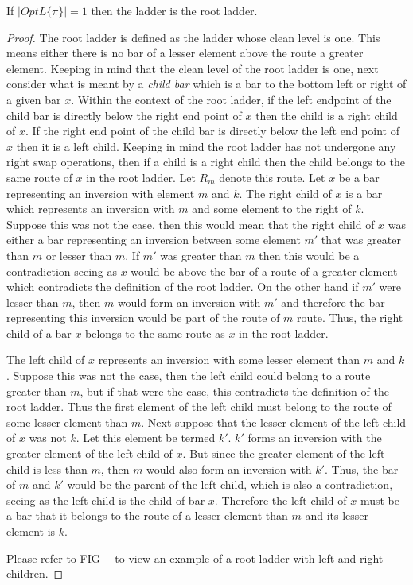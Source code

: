 \begin{theorem}
    If $|OptL\{\pi\}|=1$ then the ladder is the root ladder.
\end{theorem} 
\begin{proof}
    The root ladder is defined as the ladder whose clean level is one.
    This means either there is no bar of a lesser element above the route a 
    greater element. Keeping in mind that the clean level of the root ladder is one, next consider what is meant by a  \emph{child bar}
     which is a bar to the bottom left or right of a given bar $x$. Within the context of the root ladder, 
     if the left endpoint of the child bar is directly below the right end point of $x$ then the child is a 
    right child of $x$. If the right end point of the child bar is directly 
    below the left end point of $x$ then it is a left child. 
    Keeping in mind the root ladder has not undergone any right swap operations, then
    if a child is a right child 
    then the child belongs to the same route of $x$ in the root ladder. 
    Let $R_{m}$ denote this route. Let $x$ be a bar representing an inversion with element $m$ and $k$.
    The right child of $x$ is a bar which represents an inversion 
    with $m$ and some element to the right of $k$. Suppose this was not the case, 
    then this would mean that the right child of $x$ was either a bar representing an inversion 
    between some element $m'$ that was greater than $m$ or lesser than $m$. If $m'$ was 
    greater than $m$ then this would be a contradiction seeing as $x$ would be above the bar of a route 
    of a greater element which contradicts the definition of the root ladder. On the other hand if 
    $m'$ were lesser than $m$, then $m$ would form an inversion with $m'$ and therefore 
    the bar representing this inversion would be part of the route of $m$ route. Thus, the right child 
    of a bar $x$ belongs to the same route as $x$ in the root ladder.\par The left child of $x$
    represents an inversion with some lesser element than $m$ and $k$. Suppose this was not the case, 
    then the left child could belong to a route greater than $m$, but if that were the case, this contradicts 
    the definition of the root ladder.
    Thus the first element of the left child must belong to the route of some lesser element than $m$. Next suppose that 
    the lesser element of the left child of $x$ was not $k$. Let this element be termed $k'$.
    $k'$ forms an inversion with the greater element of the left child of $x$. But since the greater element of the left child is less than $m$, 
    then $m$ would also form an inversion with $k'$. Thus, the bar of $m$ and $k'$ would be the parent of the left child, which is also 
    a contradiction, seeing as the left child is the child of bar $x$. Therefore the left child of $x$ must be a bar that 
    it belongs to the route of a lesser element than $m$ and its lesser element is $k$.\par 
    Please refer to FIG--- to view an example of a root ladder with left and right children.\pagebreak

    
\end{proof}


